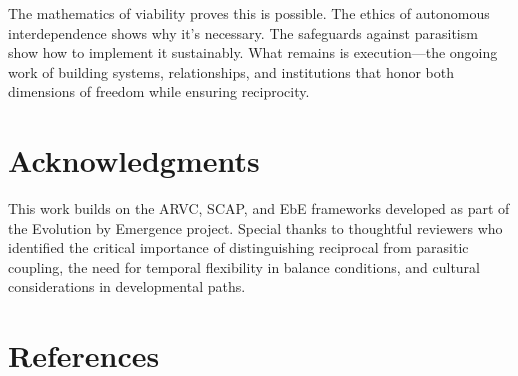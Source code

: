 \documentclass[11pt,a4paper]{article}
\begin{document}
The mathematics of viability proves this is possible. The ethics of autonomous interdependence shows why it's necessary. The safeguards against parasitism show how to implement it sustainably. What remains is execution---the ongoing work of building systems, relationships, and institutions that honor both dimensions of freedom while ensuring reciprocity.

\section*{Acknowledgments}

This work builds on the ARVC, SCAP, and EbE frameworks developed as part of the Evolution by Emergence project. Special thanks to thoughtful reviewers who identified the critical importance of distinguishing reciprocal from parasitic coupling, the need for temporal flexibility in balance conditions, and cultural considerations in developmental paths.

\section*{References}
\end{document}
